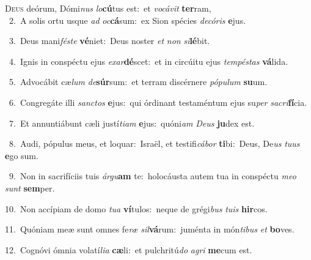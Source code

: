 \lettrine{\initial\textcolor{\initialcolor}{D}}{eus} deórum, Dómi\textit{nus} \textit{lo}\-\textbf{cú}tus est:~\star et \textit{vo}\-\textit{cá}\textit{vit} \textbf{ter}\-ram,\\
{\numbfont\textcolor{\numbcolor}{~2.}}~A solis ortu usque \textit{ad} \textit{oc}\-\textbf{cá}sum:~\star ex Sion spécies \textit{de}\-\textit{có}\textit{ris} \textbf{e}\-jus.\par
{\numbfont\textcolor{\numbcolor}{~3.}}~Deus mani\-\textit{fés}\-\textit{te} \textbf{vé}\-niet:~\star Deus noster \textit{et} \textit{non} \textit{si}\-\textbf{lé}bit.\par
{\numbfont\textcolor{\numbcolor}{~4.}}~Ignis in conspéctu ejus \textit{ex}\-\textit{ar}\textbf{dé}scet:~\star et in circúitu ejus \textit{tem}\-\textit{pés}\textit{tas} \textbf{vá}\-lida.\par
{\numbfont\textcolor{\numbcolor}{~5.}}~Advocábit cæ\textit{lum} \textit{de}\-\textbf{súr}sum:~\star et terram discérnere \textit{pó}\-\textit{pu}\textit{lum} \textbf{su}\-um.\par
{\numbfont\textcolor{\numbcolor}{~6.}}~Congregáte illi \textit{sanc}\-\textit{tos} \textbf{e}\-jus:~\star qui órdinant testaméntum ejus su\textit{per} \textit{sa}\-\textit{cri}\textbf{fí}cia.\par
{\numbfont\textcolor{\numbcolor}{~7.}}~Et annuntiábunt cæli justí\-\textit{ti}\-\textit{am} \textbf{e}\-jus:~\star quóni\textit{am} \textit{De}\-\textit{us} \textbf{ju}\-dex est.\par
{\numbfont\textcolor{\numbcolor}{~8.}}~Audi, pópulus meus, et loquar:~\dagger Israël, et testifi\-\textit{cá}\-\textit{bor} \textbf{ti}\-bi:~\star Deus, De\textit{us} \textit{tu}\-\textit{us} \textbf{e}\-go sum.\par
{\numbfont\textcolor{\numbcolor}{~9.}}~Non in sacrifíciis tuis \textit{ár}\-\textit{gu}\textbf{am} te:~\star holocáusta autem tua in conspéctu \textit{me}\-\textit{o} \textit{sunt} \textbf{sem}\-per.\par
{\numbfont\textcolor{\numbcolor}{10.}}~Non accípiam de domo \textit{tu}\-\textit{a} \textbf{ví}\-tulos:~\star neque de grégi\textit{bus} \textit{tu}\-\textit{is} \textbf{hir}\-cos.\par
{\numbfont\textcolor{\numbcolor}{11.}}~Quóniam meæ sunt omnes fe\textit{ræ} \textit{sil}\-\textbf{vá}rum:~\star juménta in món\-\textit{ti}\-\textit{bus} \textit{et} \textbf{bo}\-ves.\par
{\numbfont\textcolor{\numbcolor}{12.}}~Cognóvi ómnia volatí\-\textit{li}\-\textit{a} \textbf{cæ}\-li:~\star et pulchritú\textit{do} \textit{a}\-\textit{gri} \textbf{me}\-cum est.\par
